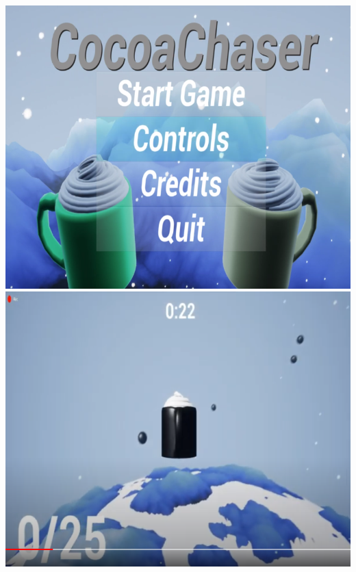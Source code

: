 \documentclass[../r.tex]{subfiles}
\begin{document}
\noindent
\href{https://randompast.itch.io/cocoachaser}{\includegraphics[scale=0.32]{../fun/winterjam.png}}
\href{https://www.youtube.com/watch?v=jUu5Zi5cRok&feature=emb_logo}{\includegraphics[scale=0.285]{../fun/winter_jam.png}}
\end{document}
